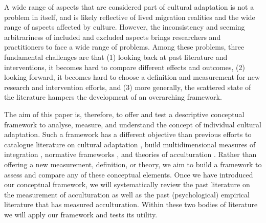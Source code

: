 \documentclass[man, 12pt, a4paper]{apa7}
\begin{document}
A wide range of aspects that are considered part of cultural adaptation is not a problem in itself, and is likely reflective of lived migration realities and the wide range of aspects affected by culture. However, the inconsistency and seeming arbitrariness of included and excluded aspects brings researchers and practitioners to face a wide range of problems. Among these problems, three fundamental challenges are that (1) looking back at past literature and interventions, it becomes hard to compare different effects and outcomes, (2) looking forward, it becomes hard to choose a definition and measurement for new research and intervention efforts, and (3) more generally, the scattered state of the literature hampers the development of an overarching framework.

The aim of this paper is, therefore, to offer and test a descriptive conceptual framework to analyse, measure, and understand the concept of individual cultural adaptation. Such a framework has a different objective than previous efforts to catalogue literature on cultural adaptation \citep[e.g.,][]{Castels2003}, build multidimensional measures of integration \citep[e.g.,][]{Harder2018}, normative frameworks \citep[e.g.,][]{Ager2008a}, and theories of acculturation \citep[e.g.,][]{Berry2005}. Rather than offering a new measurement, definition, or theory, we aim to build a framework to assess and compare any of these conceptual elements. 
Once we have introduced our conceptual framework, we will systematically review the past literature on the measurement of acculturation as well as the past (psychological) empirical literature that has measured acculturation. Within these two bodies of literature we will apply our framework and tests its utility. \\

\end{document}
